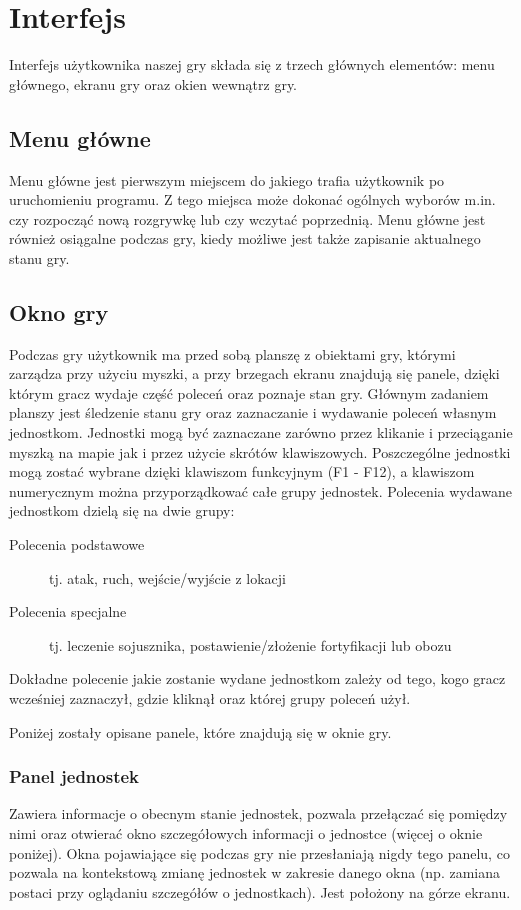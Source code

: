 \documentclass[licencjacka]{pracamgr}
\begin{document}
  \section{Interfejs}
    Interfejs użytkownika naszej gry składa się z trzech głównych elementów: menu głównego, ekranu gry oraz okien wewnątrz gry.

    \subsection{Menu główne}
      Menu główne jest pierwszym miejscem do jakiego trafia użytkownik po uruchomieniu programu. Z tego miejsca może dokonać ogólnych wyborów m.in. czy
      rozpocząć nową rozgrywkę lub czy wczytać poprzednią. Menu główne jest również osiągalne podczas gry, kiedy możliwe jest także zapisanie aktualnego stanu gry.

    \subsection{Okno gry}
      Podczas gry użytkownik ma przed sobą planszę z obiektami gry, którymi zarządza przy użyciu myszki, a przy brzegach ekranu znajdują się panele,
      dzięki którym gracz wydaje część poleceń oraz poznaje stan gry. Głównym zadaniem planszy jest śledzenie stanu gry oraz zaznaczanie i wydawanie poleceń
      własnym jednostkom. Jednostki mogą być zaznaczane zarówno przez klikanie i przeciąganie myszką na mapie jak i przez użycie skrótów klawiszowych.
      Poszczególne jednostki mogą zostać wybrane dzięki klawiszom funkcyjnym (F1 - F12), a klawiszom numerycznym można przyporządkować całe grupy jednostek.
      Polecenia wydawane jednostkom dzielą się na dwie grupy:
      \begin{description}
       \item[Polecenia podstawowe] tj. atak, ruch, wejście/wyjście z lokacji
       \item[Polecenia specjalne] tj. leczenie sojusznika, postawienie/złożenie fortyfikacji lub obozu
      \end{description}
      Dokładne polecenie jakie zostanie wydane jednostkom zależy od tego, kogo gracz wcześniej zaznaczył, gdzie kliknął oraz której grupy poleceń użył.

      Poniżej zostały opisane panele, które znajdują się w oknie gry.

      \subsubsection{Panel jednostek}
      Zawiera informacje o obecnym stanie jednostek, pozwala przełączać się pomiędzy nimi oraz otwierać okno szczegółowych informacji o jednostce
      (więcej o oknie poniżej). Okna pojawiające się podczas gry nie przesłaniają nigdy tego panelu, co pozwala na kontekstową zmianę jednostek
      w zakresie danego okna (np. zamiana postaci przy oglądaniu szczegółów o jednostkach). Jest położony na górze ekranu.
\end{document}
